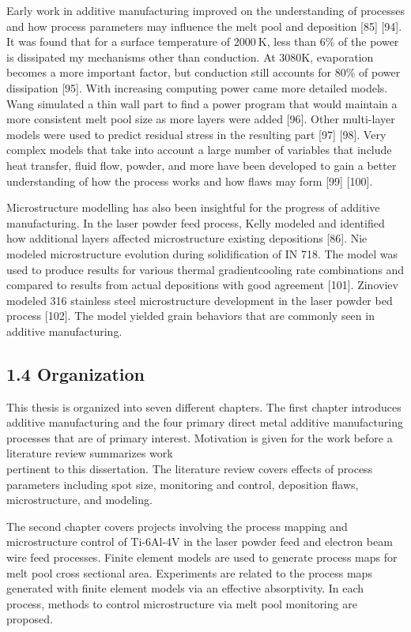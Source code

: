 \documentclass[10pt]{article}
\begin{document}
Early work in additive manufacturing improved on the understanding of processes and how process parameters may influence the melt pool and deposition [85] [94]. It was found that for a surface temperature of $2000 \mathrm{~K}$, less than $6 \%$ of the power is dissipated my mechanisms other than conduction. At 3080K, evaporation becomes a more important factor, but conduction still accounts for $80 \%$ of power dissipation [95]. With increasing computing power came more detailed models. Wang simulated a thin wall part to find a power program that would maintain a more consistent melt pool size as more layers were added [96]. Other multi-layer models were used to predict residual stress in the resulting part [97] [98]. Very complex models that take into account a large number of variables that include heat transfer, fluid flow, powder, and more have been developed to gain a better understanding of how the process works and how flaws may form [99] [100].

Microstructure modelling has also been insightful for the progress of additive manufacturing. In the laser powder feed process, Kelly modeled and identified how additional layers affected microstructure existing depositions [86]. Nie modeled microstructure evolution during solidification of IN 718. The model was used to produce results for various thermal gradientcooling rate combinations and compared to results from actual depositions with good agreement [101]. Zinoviev modeled 316 stainless steel microstructure development in the laser powder bed process [102]. The model yielded grain behaviors that are commonly seen in additive manufacturing.

\subsection*{1.4 Organization}
This thesis is organized into seven different chapters. The first chapter introduces additive manufacturing and the four primary direct metal additive manufacturing processes that are of primary interest. Motivation is given for the work before a literature review summarizes work\\
pertinent to this dissertation. The literature review covers effects of process parameters including spot size, monitoring and control, deposition flaws, microstructure, and modeling.

The second chapter covers projects involving the process mapping and microstructure control of Ti-6Al-4V in the laser powder feed and electron beam wire feed processes. Finite element models are used to generate process maps for melt pool cross sectional area. Experiments are related to the process maps generated with finite element models via an effective absorptivity. In each process, methods to control microstructure via melt pool monitoring are proposed.
\end{document}
